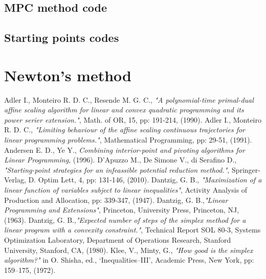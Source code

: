 \documentclass[a4paper,10 pt,titlepage,twoside]{book}
\theoremstyle{plain}
\theoremstyle{definition}
\theoremstyle{remark}
\begin{document}
\section{MPC method code}

\newpage
\section{Starting points codes}
 
 
	\chapter*{Newton's method}
\begin{thebibliography}{9}
	
	
	 Adler I., Monteiro R. D. C., Resende M. G. C., \emph{ "A polynomial-time primal-dual affine scaling algorithm for linear and convex quadratic programming and its power serier extension."}, Math. of OR, 15, pp: 191-214, (1990).
	 Adler I., Monteiro R. D. C., \emph{ "Limiting behaviour of the affine scaling continuous trajectories for linear programming problems."}, Mathematical Programming, pp: 29-51, (1991).
	 Andersen E. D., Ye Y.,  \textit{Combining interior-point and pivoting algorithms for Linear Programming}, (1996).
	 D'Apuzzo M., De Simone V., di Serafino D., \emph{ "Starting-point strategies for an infeassible potential reduction method."}, Springer-Verlag, D. Optim Lett, 4, pp: 131-146, (2010).
	Dantzig, G. B.,\textit{ "Maximization of a linear function of variables subject to linear
	inequalities"}, Activity Analysis of Production and Allocation, pp: 339-347, (1947).
	Dantzig, G. B.,\emph{\;"Linear Programming and Extensions"}, Princeton, University Press, Princeton, NJ, (1963).	
	Dantzig, G. B.,\emph{\;"Expected number of steps of the simplex method for a linear program with a convexity constraint."}, Technical Report SOL 80-3, Systems Optimization Laboratory, Department of Operations Research, Stanford University, Stanford, CA, (1980).
		 Klee, V., Minty, G., \emph{ "How good is the simplex algorithm?"} in O. Shisha, ed.,
	‘Inequalities–III’, Academic Press, New York, pp: 159–175, (1972).


\end{thebibliography}
\end{document}
